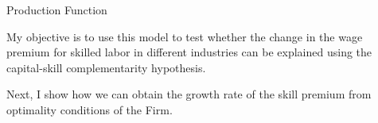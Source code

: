 \documentclass[notes,11pt, aspectratio=169]{beamer}
\newenvironment{wideitemize}{\itemize\addtolength{\itemsep}{10pt}}{\enditemize}
\begin{document}
\begin{frame}{Production Function}
 \begin{wideitemize}
 \item My objective is to use this model to test whether the change in the wage premium for skilled labor in different industries can be explained using the capital-skill complementarity hypothesis.
 
 \item Next, I show how we can obtain the growth rate of the skill premium from optimality conditions of the Firm.


 
 \end{wideitemize}
\end{frame}
\end{document}
